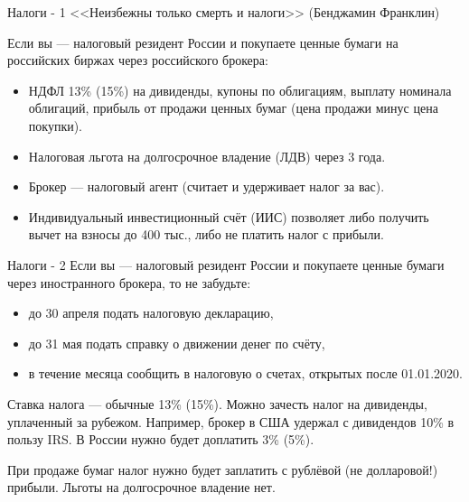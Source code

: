 \documentclass{beamer}
\begin{document}
\begin{frame}{Налоги - 1}
\justify
<<Неизбежны только смерть и налоги>> (Бенджамин Франклин)

\justify
Если вы --- налоговый резидент России и покупаете ценные бумаги на российских биржах через российского брокера:
\begin{itemize}
\justifying
\item НДФЛ 13\% (15\%) на дивиденды, купоны по облигациям, выплату номинала облигаций, прибыль от продажи ценных бумаг (цена продажи минус цена покупки).
\item Налоговая льгота на долгосрочное владение (ЛДВ) через 3 года.
\item Брокер --- налоговый агент (считает и удерживает налог за вас).
\item Индивидуальный инвестиционный счёт (ИИС) позволяет либо получить вычет на взносы до 400 тыс., либо не платить налог с прибыли.
\end{itemize}
\end{frame}



\begin{frame}{Налоги - 2}
\justify
Если вы --- налоговый резидент России и покупаете ценные бумаги через иностранного брокера, то не забудьте:
\begin{itemize}
\justifying
\item до 30 апреля подать налоговую декларацию,
\item до 31 мая подать справку о движении денег по счёту,
\item в течение месяца сообщить в налоговую о счетах, открытых после 01.01.2020. 
\end{itemize}

\justify
Ставка налога --- обычные 13\% (15\%). Можно зачесть налог на дивиденды, уплаченный за рубежом. Например, брокер в США удержал с дивидендов 10\% в пользу IRS. В России нужно будет доплатить 3\% (5\%).

\justify
При продаже бумаг налог нужно будет заплатить с рублёвой (не долларовой!) прибыли. Льготы на долгосрочное владение нет. 
\end{frame}
\end{document}

